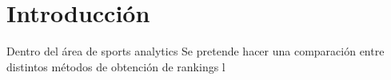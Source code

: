 \section{Introducción}

Dentro del área de sports analytics
Se pretende hacer una comparación entre distintos métodos de obtención de rankings l